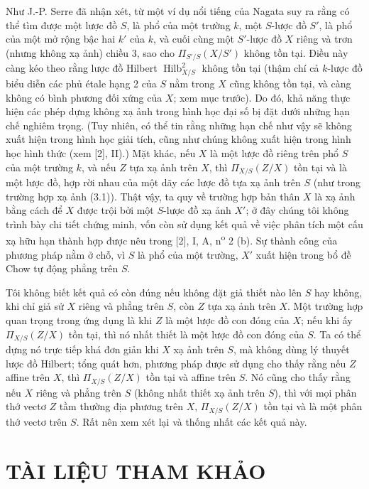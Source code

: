
Như J.-P. Serre đã nhận xét, từ một ví dụ nổi tiếng của Nagata suy ra rằng có
thể tìm được một lược đồ $S$, là phổ của một trường $k$, một $S$-lược đồ $S'$,
là phổ của một mở rộng bậc hai $k'$ của $k$, và cuối cùng một $S'$-lược đồ $X$
riêng và trơn (nhưng không xạ ảnh) chiều 3, sao cho $\Pi_{S'/S}(X/S')$ không
tồn tại. Điều này càng kéo theo rằng lược đồ Hilbert
$\operatorname{Hilb}^2_{X/S}$ không tồn tại (thậm chí cả $k$-lược đồ biểu diễn
các phủ étale hạng 2 của $S$ nằm trong $X$ cũng không tồn tại, và càng không có
bình phương đối xứng của $X$; xem mục trước). Do đó, khả năng thực hiện các
phép dựng không xạ ảnh trong hình học đại số bị đặt dưới những hạn chế nghiêm
trọng. (Tuy nhiên, có thể tin rằng những hạn chế như vậy sẽ không xuất hiện
trong hình học giải tích, cũng như chúng không xuất hiện trong hình học hình
thức (xem [2], II).) Mặt khác, nếu $X$ là một lược đồ riêng trên phổ $S$ của
một trường $k$, và nếu $Z$ tựa xạ ảnh trên $X$, thì $\Pi_{X/S}(Z/X)$ tồn tại
và là một lược đồ, hợp rời nhau của một dãy các lược đồ tựa xạ ảnh trên $S$
(như trong trường hợp xạ ảnh (3.1)). Thật vậy, ta quy về trường hợp bản thân
$X$ là xạ ảnh bằng cách để $X$ được trội bởi một $S$-lược đồ xạ ảnh $X'$; ở đây
chúng tôi không trình bày chi tiết chứng minh, vốn còn sử dụng kết quả về việc
phân tích một cấu xạ hữu hạn thành hợp được nêu trong [2], I, A,
n\textsuperscript{o} 2 (b). Sự thành công của phương pháp nằm ở chỗ, vì $S$ là
phổ của một trường, $X'$ xuất hiện trong bổ đề Chow tự động phẳng trên $S$.

Tôi không biết kết quả có còn đúng nếu không đặt giả thiết nào lên $S$ hay
không, khi chỉ giả sử $X$ riêng và phẳng trên $S$, còn $Z$ tựa xạ ảnh trên
$X$. Một trường hợp quan trọng trong ứng dụng là khi $Z$ là một lược đồ con
đóng của $X$; nếu khi ấy $\Pi_{X/S}(Z/X)$ tồn tại, thì nó nhất thiết là một
lược đồ con đóng của $S$. Ta có thể
dựng nó trực tiếp khá đơn giản khi $X$ xạ ảnh trên $S$, mà không dùng lý
thuyết lược đồ Hilbert; tổng quát hơn, phương pháp được sử dụng cho thấy rằng
nếu $Z$ affine trên $X$, thì $\Pi_{X/S}(Z/X)$ tồn tại và affine trên $S$. Nó
cũng cho thấy rằng nếu $X$ riêng và phẳng trên $S$ (không nhất thiết xạ ảnh
trên $S$), thì với mọi phân thớ vectơ $Z$ tầm thường địa phương trên $X$,
$\Pi_{X/S}(Z/X)$ tồn tại và là một phân thớ vectơ trên $S$. Rất nên xem xét
lại và thống nhất các kết quả này.

\section*{TÀI LIỆU THAM KHẢO}


